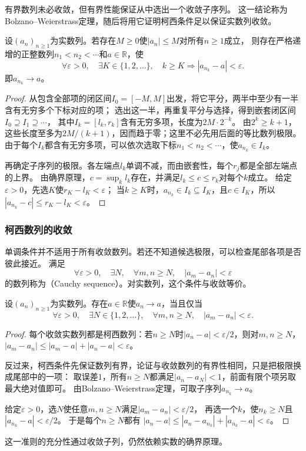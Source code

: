 有界数列未必收敛，但有界性能保证从中选出一个收敛子序列。
这一结论称为Bolzano--Weierstrass定理，随后将用它证明柯西条件足以保证实数列收敛。
\begin{theorem}
\label{thm:analysis-bounded-subsequence}
设$(a_n)_{n\geq1}$为实数列。若存在$M\geq0$使$|a_n|\leq M$对所有$n\geq1$成立，
则存在严格递增的正整数列$n_1<n_2<\cdots$和$a\in\mathbb R$，使
\[
 \forall\varepsilon>0,\quad\exists K\in\{1,2,\ldots\},\quad
 k\geq K\Longrightarrow |a_{n_k}-a|<\varepsilon.
\]
即$a_{n_k}\to a$。
\end{theorem}
\begin{proof}
从包含全部项的闭区间$I_0=[-M,M]$出发，将它平分，两半中至少有一半含有无穷多个下标对应的项；
选出这一半，再重复平分与选择，得到嵌套闭区间$I_0\supseteq I_1\supseteq\cdots$，
其中$I_k=[l_k,r_k]$含有无穷多项，长度为$2M\cdot2^{-k}$。
由$2^k\geq k+1$，这些长度至多为$2M/(k+1)$，因而趋于零；这里不必先用后面的等比数列极限。
由于每个$I_k$都含有无穷多项，可以依次选取下标$n_1<n_2<\cdots$，使$a_{n_k}\in I_k$。

再确定子序列的极限。各左端点$l_k$单调不减，而由嵌套性，每个$r_j$都是全部左端点的上界。
由确界原理，$c=\sup_k l_k$存在，并满足$l_k\leq c\leq r_k$对每个$k$成立。
给定$\varepsilon>0$，先选$K$使$r_K-l_K<\varepsilon$；
当$k\geq K$时，$a_{n_k}\in I_k\subseteq I_K$，且$c\in I_K$，所以$|a_{n_k}-c|\leq r_K-l_K<\varepsilon$。
\end{proof}

\subsubsection{柯西数列的收敛}
单调条件并不适用于所有收敛数列。若还不知道候选极限，可以检查尾部各项是否彼此接近。
满足
\[
 \forall\varepsilon>0,\quad\exists N,\quad
 \forall m,n\geq N,\quad |a_m-a_n|<\varepsilon
\]
的数列称为（Cauchy sequence）。对实数列，这个条件与收敛等价。
\begin{theorem}[柯西收敛准则]
\label{thm:analysis-cauchy-convergence}
设$(a_n)_{n\geq1}$为实数列。存在$a\in\mathbb R$使$a_n\to a$，当且仅当
\[
 \forall\varepsilon>0,\quad\exists N\in\{1,2,\ldots\},\quad
 \forall m,n\geq N,\quad |a_m-a_n|<\varepsilon.
\]
\end{theorem}
\begin{proof}
每个收敛实数列都是柯西数列：若$n\geq N$时$|a_n-a|<\varepsilon/2$，则对$m,n\geq N$，
$|a_m-a_n|\leq|a_m-a|+|a_n-a|<\varepsilon$。

反过来，柯西条件先保证数列有界，论证与收敛数列的有界性相同，只是把极限换成尾部中的一项：
取误差$1$，所有$n\geq N$都满足$|a_n-a_N|<1$，前面有限个项另取最大绝对值即可。
由Bolzano--Weierstrass定理，可取子序列$a_{n_k}\to a$。

给定$\varepsilon>0$，选$N$使任意$m,n\geq N$满足$|a_m-a_n|<\varepsilon/2$，
再选一个$k$，使$n_k\geq N$且$|a_{n_k}-a|<\varepsilon/2$。
于是每个$n\geq N$都有
$|a_n-a|\leq|a_n-a_{n_k}|+|a_{n_k}-a|<\varepsilon$。
\end{proof}
这一准则的充分性通过收敛子列，仍然依赖实数的确界原理。

